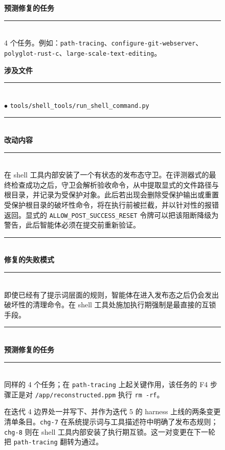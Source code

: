 \begin{figure}[t]
\begin{tcbraster}
\begin{tcolorbox}[colback=aheSky!18,colframe=aheNavy,colbacktitle=aheNavy,
                          title={\scriptsize\textbf{chg-7，迭代 5，commit \texttt{3ba3a90}，层级：提示词 + 工具描述符}}]
            \textbf{\textcolor{aheNavy}{预测修复的任务}} \\
            \rule{\linewidth}{0.3pt}\\[1pt]
            4 个任务。例如：\texttt{path-tracing}、\texttt{configure-git-webserver}、\texttt{polyglot-rust-c}、\texttt{large-scale-text-editing}。
        \end{tcolorbox}
        \begin{tcolorbox}[colback=aheTeal!12,colframe=aheBlue,colbacktitle=aheBlue,
                          title={\scriptsize\textbf{chg-8，迭代 5，commit \texttt{4e0aab9}，层级：工具实现}}]
            \textbf{\textcolor{aheBlue}{涉及文件}} \\
            \rule{\linewidth}{0.3pt}\\[1pt]
            $\bullet$ \texttt{tools/shell\_tools/run\_shell\_command.py} \\[3pt]
            \rule{\linewidth}{0.3pt}\\
            \textbf{\textcolor{aheBlue}{改动内容}} \\
            \rule{\linewidth}{0.3pt}\\[1pt]
            在 shell 工具内部安装了一个有状态的发布态守卫。在评测器式的最终检查成功之后，守卫会解析验收命令，从中提取显式的文件路径与根目录，并记录为受保护对象。此后若出现会删除受保护输出或重置受保护根目录的破坏性命令，将在执行前被拦截，并以针对性的报错返回。显式的 \texttt{ALLOW\_POST\_SUCCESS\_RESET} 令牌可以把该阻断降级为警告，此后智能体必须在提交前重新验证。 \\[3pt]
            \rule{\linewidth}{0.3pt}\\
            \textbf{\textcolor{aheBlue}{修复的失败模式}} \\
            \rule{\linewidth}{0.3pt}\\[1pt]
            即使已经有了提示词层面的规则，智能体在进入发布态之后仍会发出破坏性的清理命令。在 shell 工具处施加执行期强制是最直接的互锁手段。 \\[3pt]
            \rule{\linewidth}{0.3pt}\\
            \textbf{\textcolor{aheBlue}{预测修复的任务}} \\
            \rule{\linewidth}{0.3pt}\\[1pt]
            同样的 4 个任务；在 \texttt{path-tracing} 上起关键作用，该任务的 F4 步骤正是对 \texttt{/app/reconstructed.ppm} 执行 \texttt{rm -rf}。
        \end{tcolorbox}
    \end{tcbraster}
    \caption{在迭代 4 边界处一并写下、并作为迭代 5 的 harness 上线的两条变更清单条目。\texttt{chg-7} 在系统提示词与工具描述符中明确了发布态规则；\texttt{chg-8} 则在 shell 工具内部安装了执行期互锁。这一对变更在下一轮把 \texttt{path-tracing} 翻转为通过。}
    \label{fig:manifest-publish-state}
\end{figure}
